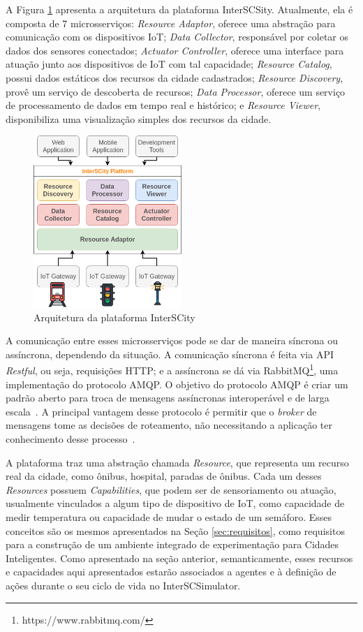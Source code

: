 A Figura \ref{fig:platform_architecture} apresenta a arquitetura da plataforma InterSCSity.
Atualmente, ela é composta de 7 microsserviços:
\textit{Resource Adaptor}, oferece uma abstração para comunicação com os dispositivos IoT;
\textit{Data Collector}, responsável por coletar os dados dos sensores conectados;
\textit{Actuator Controller}, oferece uma interface para atuação junto aos dispositivos de IoT com tal capacidade;
\textit{Resource Catalog}, possui dados estáticos dos recursos da cidade cadastrados;
\textit{Resource Discovery}, provê um serviço de descoberta de recursos;
\textit{Data Processor}, oferece um serviço de processamento de dados em tempo real e histórico;
e \textit{Resource Viewer}, disponibiliza uma visualização simples dos recursos da cidade. 

\begin{figure}[ht]
	\centering
	\includegraphics[width=0.5\textwidth]{figuras/platform_architecture.png}
	\caption{Arquitetura da plataforma InterSCity}
	\label{fig:platform_architecture}
\end{figure}

A comunicação entre esses microsserviços pode se dar de maneira síncrona ou assíncrona, dependendo da situação.
A comunicação síncrona é feita via API \textit{Restful}, ou seja, requisições HTTP; e a assíncrona se dá via RabbitMQ\footnote{https://www.rabbitmq.com/}, uma implementação do protocolo AMQP.
O objetivo do protocolo AMQP é criar um padrão aberto para troca de mensagens assíncronas interoperável e de larga escala~\citep{vinoski_2006}.
A principal vantagem desse protocolo é permitir que o \textit{broker} de mensagens tome as decisões de roteamento, não necessitando a aplicação ter conhecimento
desse processo~\citep{vinoski_2006}.

A plataforma traz uma abstração chamada \textit{Resource}, que representa um recurso real da cidade, como ônibus, hospital, paradas de ônibus.
Cada um desses \textit{Resources} possuem \textit{Capabilities}, que podem ser de sensoriamento ou atuação, usualmente vinculados a algum tipo de dispositivo de IoT,
como capacidade de medir temperatura ou capacidade de mudar o estado de um semáforo.
Esses conceitos são os mesmos apresentados na Seção \ref{sec:requisitos}, como requisitos para a construção de um ambiente integrado de experimentação para Cidades Inteligentes.
Como apresentado na seção anterior, semanticamente, esses recursos e capacidades aqui apresentados estarão associados a agentes e à definição de ações durante o seu
ciclo de vida no InterSCSimulator.

